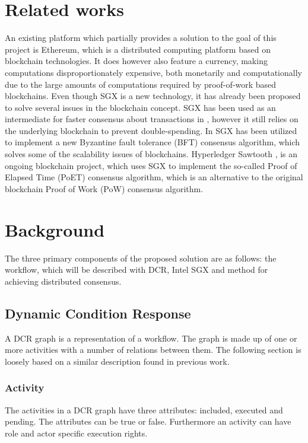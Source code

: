 \documentclass[12pt]{article}
\begin{document}
	\section{Related works}

	An existing platform which partially provides a solution to the goal of this project is Ethereum\cite{ethereum-white-paper}, which is a distributed computing platform based on blockchain technologies.
	It does however also feature a currency, making computations disproportionately expensive, both monetarily and computationally due to the large amounts of computations required by proof-of-work based blockchains.
	Even though SGX is a new technology, it has already been proposed to solve several issues in the blockchain concept. 
	SGX has been used as an intermediate for faster consensus about transactions in \cite{improv-btc}, however it still relies on the underlying blockchain to prevent double-spending.
	In \cite{fastbft} SGX has been utilized to implement a new Byzantine fault tolerance (BFT) consensus algorithm, which solves some of the scalability issues of blockchains.
	Hyperledger Sawtooth \cite{poet}, is an ongoing blockchain project, which uses SGX to implement the so-called Proof of Elapsed Time (PoET) consensus algorithm, which is an alternative to the original blockchain Proof of Work (PoW) consensus algorithm.

	\section{Background}

	The three primary components of the proposed solution are as follows: the workflow, which will be described with DCR, Intel SGX and method for achieving distributed consensus.

		\subsection{Dynamic Condition Response}
		A DCR graph is a representation of a workflow.
		The graph is made up of one or more activities with a number of relations between them. 
		The following section is loosely based on a similar description found in previous work\cite{dcreum}.

		\subsubsection{Activity}
		The activities in a DCR graph have three attributes: included, executed and pending. 
		The attributes can be true or false. 
		Furthermore an activity can have role and actor specific execution rights.
\end{document}
